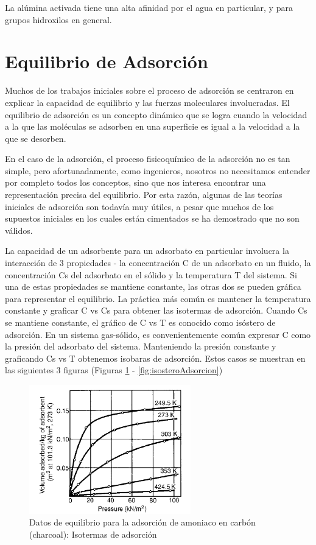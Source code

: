 \documentclass[11pt]{book}
\begin{document}
La alúmina activada tiene una alta afinidad por el agua en particular, y para grupos hidroxilos en general. 


\section{Equilibrio de Adsorción}

Muchos de los trabajos iniciales sobre el proceso de adsorción se centraron en explicar la capacidad de equilibrio y las fuerzas moleculares involucradas. El equilibrio de adsorción es un concepto dinámico que se logra cuando la velocidad a la que las moléculas se adsorben en una superficie es igual a la velocidad a la que se desorben.

En el caso de la adsorción, el proceso fisicoquímico de la adsorción no es tan simple, pero afortunadamente, como ingenieros, nosotros no necesitamos entender por completo todos los conceptos, sino que nos interesa encontrar una representación precisa del equilibrio. Por esta razón, algunas de las teorías iniciales de adsorción son todavía muy útiles, a pesar que muchos de los supuestos iniciales en los cuales están cimentados se ha demostrado que no son válidos. 

La capacidad de un adsorbente para un adsorbato en particular involucra la interacción de 3 propiedades - la concentración C de un adsorbato en un fluido, la concentración Cs del adsorbato en el sólido y la temperatura T del sistema. Si una de estas propiedades se mantiene constante, las otras dos se pueden gráfica para representar el equilibrio. La práctica más común es mantener la temperatura constante y graficar C vs Cs para obtener las isotermas de adsorción. Cuando Cs se mantiene constante, el gráfico de C vs T es conocido como isóstero de adsorción. En un sistema gas-sólido, es convenientemente común expresar C como la presión del adsorbato del sistema. Manteniendo la presión constante y graficando Cs vs T obtenemos isobaras de adsorción. Estos casos se muestran en las siguientes 3 figuras (Figuras \ref{fig:isotermaAdsorcion} - \ref{fig:isosteroAdsorcion})

\begin{figure}[H]
    \centering
    \includegraphics[width=7cm]{img/adsorcion/IsotermaEquilibrio.PNG}
    \caption{Datos de equilibrio para la adsorción de amoniaco en carbón (charcoal): Isotermas de adsorción}
    \label{fig:isotermaAdsorcion}
\end{figure}
\end{document}
